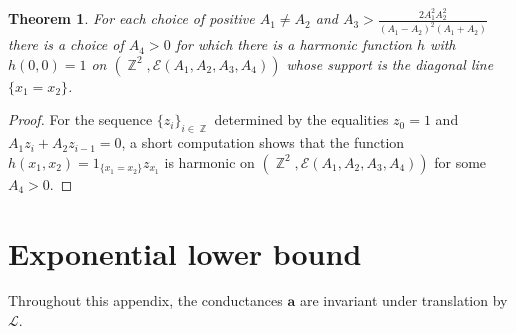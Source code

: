 \documentclass{daj}
\newtheorem{theorem}{Theorem}[section]
\newcommand{\cond}{\mathbf{a}}
\DeclareMathOperator{\Z}{\mathbb{Z}}
\begin{document}
\begin{theorem}\label{theorem:counterexample}
	For each choice of positive $A_1 \neq A_2$
	and $A_3 > \frac{2 A_1^2 A_2^2}{{(A_1-A_2)}^2 (A_1+A_2)}$
	there is a choice of $A_4 > 0$ for which there is a harmonic
	function $h$ with $h(0,0) = 1$ on $(\Z^2, \mathcal{E}(A_1,A_2,A_3,A_4))$ whose support is the diagonal line $\{x_1 = x_2\}$.
\end{theorem}

\begin{proof}
	For the sequence $\{z_i\}_{i \in \Z}$ determined by the equalities $z_0 = 1$ and $A_1 z_{i}  + A_2 z_{i-1} = 0$,
	a short computation shows that
	the function $h(x_1, x_2) = 1_{\{ x_1 = x_2\}} z_{x_1}$
	is harmonic on $(\Z^2, \mathcal{E}(A_1,A_2,A_3,A_4))$ for some $A_4 > 0$.
\end{proof}




\appendix

\section{Exponential lower bound}
Throughout this appendix, the conductances $\cond$ are invariant under translation by $\mathcal L$.
\end{document}
